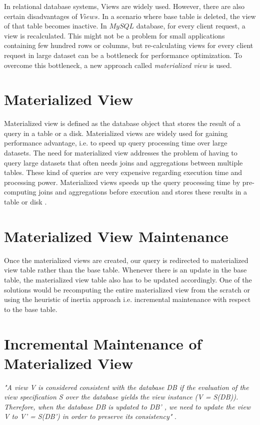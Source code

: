 \documentclass[11pt,a4paper,bibtotoc,idxtotoc,headsepline,footsepline,footexclude,BCOR12mm,DIV13]{scrbook}
\begin{document}
In relational database systems, Views are widely used. However, there are also certain disadvantages of $Views$. In a scenario where base table is deleted, the view of that table becomes inactive. In $MySQL$ database, for every client request, a view is recalculated. This might not be a problem for small applications containing few hundred rows or columns, but re-calculating views for every client request in large dataset can be a bottleneck for performance optimization. To overcome this bottleneck, a new approach called \emph{materialized view} is used.


\section{Materialized View}

Materialized view is defined as the database object that stores the result of a query in a table or a disk. Materialized views are widely used for gaining performance advantage, i.e. to speed up query processing time over large datasets. The need for materialized view addresses the problem of having to query large datasets that often needs joins and aggregations between multiple tables. These kind of queries are very expensive regarding execution time and processing power. Materialized views speeds up the query processing time by pre-computing joins and aggregations before execution and stores these results in a table or disk \cite{materializedview:oracle}. 

\section{Materialized View Maintenance}
Once the materialized views are created, our query is redirected to materialized view table rather than the base table. Whenever there is an update in the base table, the materialized view table also has to be updated accordingly. One of the solutions would be recomputing the entire materialized view from the scratch or using the heuristic of inertia \cite{maintenance:materializedviews} approach i.e. incremental maintenance with respect to the base table.

\section{Incremental Maintenance of Materialized View}
\emph{"A view V is considered consistent with the database DB if the evaluation of the view specification S over the database yields the view instance (V = S(DB)). Therefore, when the database DB is updated to DB' , we need to update the view V to V' = S(DB') in order to preserve its consistency"} \cite{incrementalmaintenance:materializedviews}. 
\end{document}
